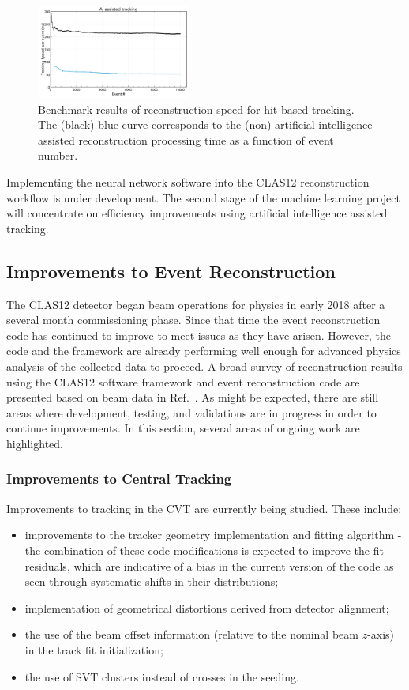 \begin{figure}
\centering
\includegraphics[width=0.45\textwidth]{pics/nn2.png}
\caption{Benchmark results of reconstruction speed for hit-based tracking. The (black) blue curve corresponds to
  the (non) artificial intelligence assisted reconstruction processing time as a function of event number.}
\label{fig:nn2}
\end{figure}

Implementing the neural network software into the CLAS12 reconstruction workflow is under development.
The second stage of the machine learning project will concentrate on efficiency improvements using artificial
intelligence assisted tracking.

\subsection{Improvements to Event Reconstruction}

The CLAS12 detector began beam operations for physics in early 2018 after a several month commissioning
phase. Since that time the event reconstruction code has continued to improve to meet issues as they have
arisen. However, the code and the framework are already performing well enough for advanced physics
analysis of the collected data to proceed. A broad survey of reconstruction results using the CLAS12
software framework and event reconstruction code are presented based on beam data in Ref.~\cite{clas12-nim}.
As might be expected, there are still areas where development, testing, and validations are in progress in
order to continue improvements. In this section, several areas of ongoing work are highlighted.

\subsubsection{Improvements to Central Tracking}

Improvements to tracking in the CVT are currently being studied. These include:

\begin{itemize}
\item improvements to the tracker geometry implementation and fitting algorithm - the combination of these
  code modifications is expected to improve the fit residuals, which are indicative of a bias in the current
  version of the code as seen through systematic shifts in their distributions;
\item implementation of geometrical distortions derived from detector alignment;
\item the use of the beam offset information (relative to the nominal beam $z$-axis) in the track fit initialization;
\item the use of SVT clusters instead of crosses in the seeding.
\end{itemize}

